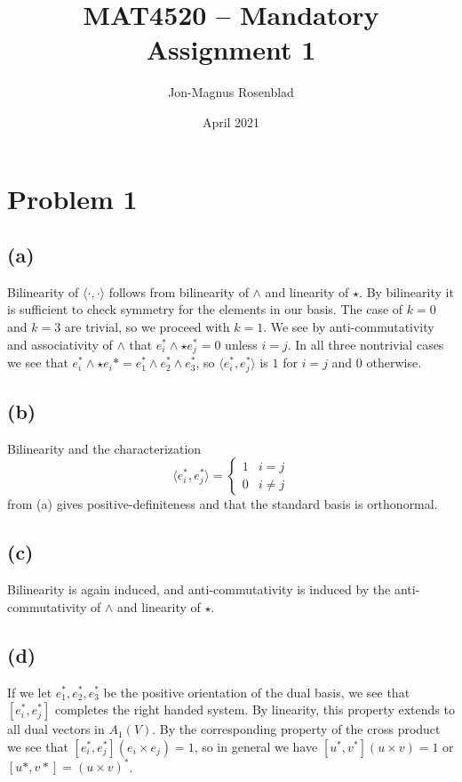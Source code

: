 \documentclass[english]{article}
\author{Jon-Magnus Rosenblad}
\date{April 2021}
\title{MAT4520 -- Mandatory Assignment 1}
\begin{document}
\maketitle

\section*{Problem 1}
\subsection*{(a)}
Bilinearity of $\langle\cdot,\cdot\rangle$ follows from bilinearity of $\wedge$ and linearity of $\star$.
By bilinearity it is sufficient to check symmetry for the elements in our basis.
The case of $k=0$ and $k=3$ are trivial, so we proceed with $k=1$.
We see by anti-commutativity and associativity of $\wedge$
that $e_i^\ast \wedge \star e_j^\ast =0$ unless $i=j$.
In all three nontrivial cases we see that $e_i^\ast\wedge\star e_i\ast=e_1^\ast\wedge e_2^\ast\wedge e_3^\ast$,
so $\langle e_i^\ast,e_j^\ast\rangle$ is $1$ for $i=j$ and $0$ otherwise.

\subsection*{(b)}
Bilinearity and the characterization
\begin{equation*}
    \langle e_i^\ast, e_j^\ast\rangle = \begin{cases}
        1 & i=j\\
        0 & i\neq j
    \end{cases}
\end{equation*}
from (a) gives positive-definiteness and that the standard basis is orthonormal.

\subsection*{(c)}
Bilinearity is again induced, and anti-commutativity is induced by the anti-commutativity of $\wedge$ and linearity of $\star$.

\subsection*{(d)}
If we let $e_1^\ast,e_2^\ast,e_3^\ast$ be the positive orientation of the dual basis,
we see that $[e_i^\ast,e_j^\ast]$ completes the right handed system.
By linearity, this property extends to all dual vectors in $A_1(V)$.
By the corresponding property of the cross product we see that 
$[e_i^\ast,e_j^\ast](e_i\times e_j) = 1$,
so in general we have $[u^\ast, v^\ast](u\times v)=1$ or $[u\ast, v\ast] = (u\times v)^\ast$.
\end{document}
